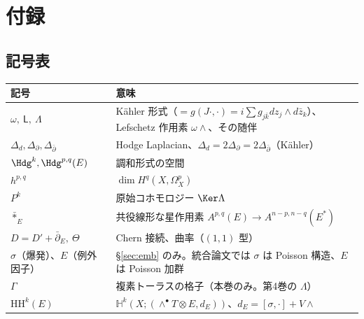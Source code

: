 \section*{付録}
\subsection*{記号表}
\begin{center}\small
\begin{tabular}{p{}p{}}
\toprule
記号 & 意味\\\midrule
$\omega,\ \mathsf L,\ \Lambda$ & Kähler 形式（$=g(J\cdot,\cdot)=i\sum g_{j\bar k}dz_j\wedge d\bar z_k$）、Lefschetz 作用素 $\omega\wedge$、その随伴\\
$\Delta_d,\Delta_\partial,\Delta_{\bar\partial}$ & Hodge Laplacian、$\Delta_d=2\Delta_\partial=2\Delta_{\bar\partial}$（Kähler）\\
$\Hdg^k,\Hdg^{p,q}(E)$ & 調和形式の空間\\
$h^{p,q}$ & $\dim H^q(X,\Omega^p_X)$\\
$P^k$ & 原始コホモロジー $\Ker\Lambda$\\
$\bar\ast_E$ & 共役線形な星作用素 $A^{p,q}(E)\to A^{n-p,n-q}(E^*)$\\
$D=D'+\bar\partial_E,\ \Theta$ & Chern 接続、曲率（$(1,1)$ 型）\\
$\sigma$（爆発）、$E$（例外因子） & \S\ref{sec:emb} のみ。統合論文では $\sigma$ は Poisson 構造、$E$ は Poisson 加群\\
$\Gamma$ & 複素トーラスの格子（本巻のみ。第4巻の $\Lambda$）\\
$\mathrm{HH}^k(E)$ & $\mathbb H^k(X;(\wedge^\bullet T\otimes E,d_E))$、$d_E=[\sigma,\cdot]+V\wedge$\\\bottomrule
\end{tabular}
\end{center}
